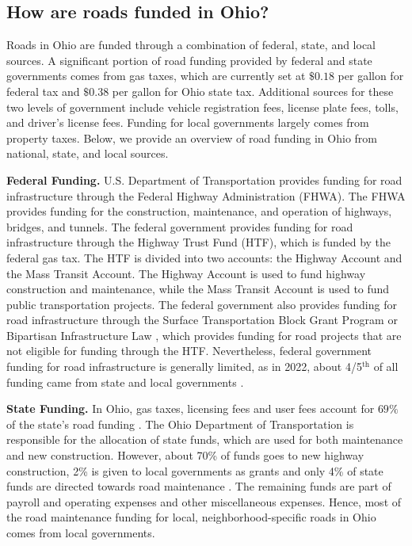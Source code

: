 \subsection{How are roads funded in Ohio?}

Roads in Ohio are funded through a combination of federal, state, and local sources. A significant portion of road funding provided by federal and state governments comes from gas taxes, which are currently set at $\$0.18$ per gallon for federal tax and $\$0.38$ per gallon for Ohio state tax. Additional sources for these two levels of government include vehicle registration fees, license plate fees, tolls, and driver's license fees. Funding for local governments largely comes from property taxes. Below, we provide an overview of road funding in Ohio from national, state, and local sources.

{\bf Federal Funding.} U.S. Department of Transportation provides funding for road infrastructure through the Federal Highway Administration (FHWA). The FHWA provides funding for the construction, maintenance, and operation of highways, bridges, and tunnels. The federal government provides funding for road infrastructure through the Highway Trust Fund (HTF), which is funded by the federal gas tax. The HTF is divided into two accounts: the Highway Account and the Mass Transit Account. The Highway Account is used to fund highway construction and maintenance, while the Mass Transit Account is used to fund public transportation projects. The federal government also provides funding for road infrastructure through the Surface Transportation Block Grant Program or Bipartisan Infrastructure Law \citep{USDOT_BIL_Ohio}, which provides funding for road projects that are not eligible for funding through the HTF. Nevertheless, federal government funding for road infrastructure is generally limited, as in 2022, about 4/5$^\text{th}$ of all funding came from state and local governments \citep{pgpf_htf_explained}.

{\bf State Funding.}
In Ohio, gas taxes, licensing fees and user fees account for $69\%$ of the state's road funding \citep{boesen2021}. The Ohio Department of Transportation is responsible for the allocation of state funds, which are used for both maintenance and new construction. However, about 70\% of funds goes to new highway construction, 2\% is given to local governments as grants and only 4\% of state funds are directed towards road maintenance \citep{odot2023}. The remaining funds are part of payroll and operating expenses and other miscellaneous expenses. Hence, most of the road maintenance funding for local, neighborhood-specific roads in Ohio comes from local governments.

